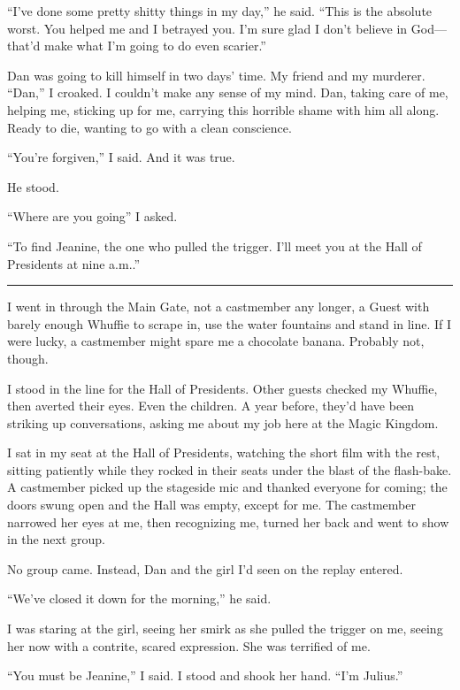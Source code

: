 “I've done some pretty shitty things in my day,” he said. “This is
the absolute worst. You helped me and I betrayed you. I'm sure glad
I don't believe in God—that'd make what I'm going to do even
scarier.”

Dan was going to kill himself in two days' time. My friend and my
murderer. “Dan,” I croaked. I couldn't make any sense of my mind.
Dan, taking care of me, helping me, sticking up for me, carrying
this horrible shame with him all along. Ready to die, wanting to go
with a clean conscience.

“You're forgiven,” I said. And it was true.

He stood.

“Where are you going” I asked.

“To find Jeanine, the one who pulled the trigger. I'll meet you at
the Hall of Presidents at nine a.m..”

\begin{center}\rule{3in}{0.4pt}\end{center}

I went in through the Main Gate, not a castmember any longer, a
Guest with barely enough Whuffie to scrape in, use the water
fountains and stand in line. If I were lucky, a castmember might
spare me a chocolate banana. Probably not, though.

I stood in the line for the Hall of Presidents. Other guests
checked my Whuffie, then averted their eyes. Even the children. A
year before, they'd have been striking up conversations, asking me
about my job here at the Magic Kingdom.

I sat in my seat at the Hall of Presidents, watching the short film
with the rest, sitting patiently while they rocked in their seats
under the blast of the flash-bake. A castmember picked up the
stageside mic and thanked everyone for coming; the doors swung open
and the Hall was empty, except for me. The castmember narrowed her
eyes at me, then recognizing me, turned her back and went to show
in the next group.

No group came. Instead, Dan and the girl I'd seen on the replay
entered.

“We've closed it down for the morning,” he said.

I was staring at the girl, seeing her smirk as she pulled the
trigger on me, seeing her now with a contrite, scared expression.
She was terrified of me.

“You must be Jeanine,” I said. I stood and shook her hand. “I'm
Julius.”

